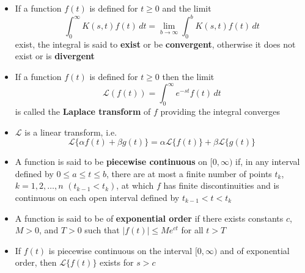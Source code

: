 \documentclass{article}
\begin{document}
\begin{itemize}
  \item If a function $f(t)$ is defined for $t \ge 0$ and the limit \[\int_0^\infty K(s, t) f(t) \,dt = \lim_{b \rightarrow \infty} \int_0^b K(s, t) f(t) \,dt\] exist, the integral is said to \textbf{exist} or be \textbf{convergent}, otherwise it does not exist or is \textbf{divergent}

  \item If a function $f(t)$ is defined for $t \ge 0$ then the limit \[\mathcal{L} (f(t)) = \int_0^\infty e^{-s t} f(t) \,dt\] is called the \textbf{Laplace transform} of $f$ providing the integral converges

  \item $\mathcal{L}$ is a linear transform, i.e. \[\mathcal{L}\{\alpha f(t) + \beta g(t)\} = \alpha \mathcal{L}\{f(t)\} + \beta \mathcal{L}\{g(t)\}\]

  \item A function is said to be \textbf{piecewise continuous} on $[0, \infty)$ if, in any interval defined by $0 \le a \le t \le b$, there are at most a finite number of points $t_k$, $k = 1, 2, \ldots, n$ $(t_{k - 1} < t_k)$, at which $f$ has finite discontinuities and is continuous on each open interval defined by $t_{k - 1} < t < t_k$

  \item A function is said to be of \textbf{exponential order} if there exists constants $c$, $M > 0$, and $T > 0$ such that $|f(t)| \le M e^{c t}$ for all $t > T$

  \item If $f(t)$ is piecewise continuous on the interval $[0, \infty)$ and of exponential order, then $\mathcal{L} \{f(t)\}$ exists for $s > c$
\end{itemize}
\end{document}
